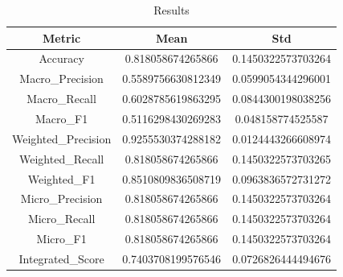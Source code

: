 \begin{table}[htbp]
\centering
\caption{Results}
\label{tab:csv}
\small
\setlength{\tabcolsep}{4pt}
\begin{tabular}{|c|c|c|}
\hline
Metric & Mean & Std \\
\hline
Accuracy & 0.818058674265866 & 0.1450322573703264 \\
Macro_Precision & 0.5589756630812349 & 0.0599054344296001 \\
Macro_Recall & 0.6028785619863295 & 0.0844300198038256 \\
Macro_F1 & 0.5116298430269283 & 0.048158774525587 \\
Weighted_Precision & 0.9255530374288182 & 0.0124443266608974 \\
Weighted_Recall & 0.818058674265866 & 0.1450322573703265 \\
Weighted_F1 & 0.8510809836508719 & 0.0963836572731272 \\
Micro_Precision & 0.818058674265866 & 0.1450322573703264 \\
Micro_Recall & 0.818058674265866 & 0.1450322573703264 \\
Micro_F1 & 0.818058674265866 & 0.1450322573703264 \\
Integrated_Score & 0.7403708199576546 & 0.0726826444494676 \\
\hline
\end{tabular}
\end{table}